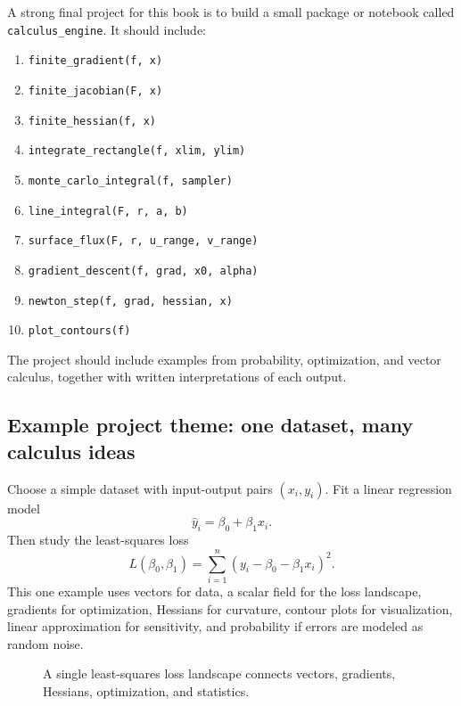 \documentclass[11pt]{article}
\begin{document}
A strong final project for this book is to build a small package or notebook called \texttt{calculus\_engine}. It should include:
\begin{enumerate}
  \item \texttt{finite\_gradient(f, x)}
  \item \texttt{finite\_jacobian(F, x)}
  \item \texttt{finite\_hessian(f, x)}
  \item \texttt{integrate\_rectangle(f, xlim, ylim)}
  \item \texttt{monte\_carlo\_integral(f, sampler)}
  \item \texttt{line\_integral(F, r, a, b)}
  \item \texttt{surface\_flux(F, r, u\_range, v\_range)}
  \item \texttt{gradient\_descent(f, grad, x0, alpha)}
  \item \texttt{newton\_step(f, grad, hessian, x)}
  \item \texttt{plot\_contours(f)}
\end{enumerate}
The project should include examples from probability, optimization, and vector calculus, together with written interpretations of each output.

\subsection*{Example project theme: one dataset, many calculus ideas}
Choose a simple dataset with input-output pairs $(x_i,y_i)$. Fit a linear regression model
\[
\hat y_i=\beta_0+\beta_1x_i.
\]
Then study the least-squares loss
\[
L(\beta_0,\beta_1)=\sum_{i=1}^n(y_i-\beta_0-\beta_1x_i)^2.
\]
This one example uses vectors for data, a scalar field for the loss landscape, gradients for optimization, Hessians for curvature, contour plots for visualization, linear approximation for sensitivity, and probability if errors are modeled as random noise.

\begin{figure}[H]
\centering
{}
\caption{A single least-squares loss landscape connects vectors, gradients, Hessians, optimization, and statistics.}
\end{figure}
\end{document}
